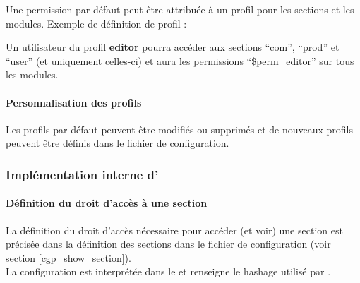 Une permission par défaut peut être attribuée à un profil pour les sections et les modules.
Exemple de définition de profil :\\


Un utilisateur du profil \textbf{editor} pourra accéder aux sections ``com'', ``prod'' et ``user'' (et uniquement celles-ci) et aura les permissions ``\$perm\_editor'' sur tous les modules.\\

\paragraph{Personnalisation des profils}

Les profils par défaut peuvent être modifiés ou supprimés et de nouveaux profils peuvent être définis dans le fichier de configuration.


\subsubsection{Implémentation interne d'\obm}

\paragraph{Définition du droit d'accès à une section}

La définition du droit d'accès nécessaire pour accéder (et voir) une section est précisée dans la définition des sections dans le fichier de configuration (voir section \ref{cgp_show_section}).\\

La configuration est interprétée dans le  et renseigne le hashage  utilisé par \obm.


